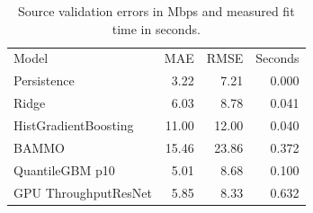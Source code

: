 \begin{table}[!ht]
\centering\small
\caption{Source validation errors in Mbps and measured fit time in seconds.}
\begin{tabular}{lrrr}
\hline
Model & MAE & RMSE & Seconds \\
Persistence & 3.22 & 7.21 & 0.000 \\
Ridge & 6.03 & 8.78 & 0.041 \\
HistGradientBoosting & 11.00 & 12.00 & 0.040 \\
BAMMO & 15.46 & 23.86 & 0.372 \\
QuantileGBM p10 & 5.01 & 8.68 & 0.100 \\
GPU ThroughputResNet & 5.85 & 8.33 & 0.632 \\
\hline
\end{tabular}
\end{table}
